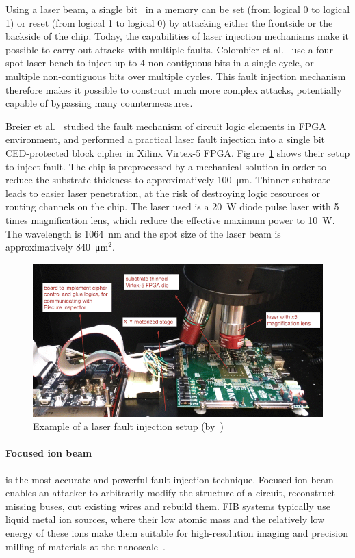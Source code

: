Using a laser beam, a single bit~\cite{CMDMRD-19-host} in a memory can be set (from logical 0 to logical 1) or reset (from logical 1 to logical 0) by attacking either the frontside or the backside of the chip.
Today, the capabilities of laser injection mechanisms make it possible to carry out attacks with multiple faults.
Colombier et al.~\cite{CGVCBLC-22-cardis} use a four-spot laser bench to inject up to 4 non-contiguous bits in a single cycle, or multiple non-contiguous bits over multiple cycles. This fault injection mechanism therefore makes it possible to construct much more complex attacks, potentially capable of bypassing many countermeasures.

Breier et al.~\cite{JHJBC-17-hss} studied the fault mechanism of circuit logic elements in FPGA environment, and performed a practical laser fault injection into a single bit CED-protected block cipher in Xilinx Virtex-5 FPGA.
Figure~\ref{fig:lfi_setup} shows their setup to inject fault.
The chip is preprocessed by a mechanical solution in order to reduce the substrate thickness to approximatively \SI{100}{\micro\metre}. Thinner substrate leads to easier laser penetration, at the risk of destroying logic resources or routing channels on the chip.
The laser used is a \SI{20}{\watt} diode pulse laser with 5 times magnification lens, which reduce the effective maximum power to \SI{10}{\watt}. The wavelength is \SI{1064}{\nano\metre} and the spot size of the laser beam is approximatively \SI{840}{\micro\metre}$^2$.

\begin{figure}[ht]
    \centering
    \includegraphics[width=\textwidth]{c2_soa/img/lfi_setup.png}
    \caption{Example of a laser fault injection setup (by~\cite{JHJBC-17-hss})}
    \label{fig:lfi_setup}
\end{figure}

\paragraph{Focused ion beam} is the most accurate and powerful fault injection technique. Focused ion beam enables an attacker to arbitrarily modify the structure of a circuit, reconstruct missing buses, cut existing wires and rebuild them. FIB systems typically use liquid metal ion sources, where their low atomic mass and the relatively low energy of these ions make them suitable for high-resolution imaging and precision milling of materials at the nanoscale~\cite{FVMBMWP-23-wfiot}.

